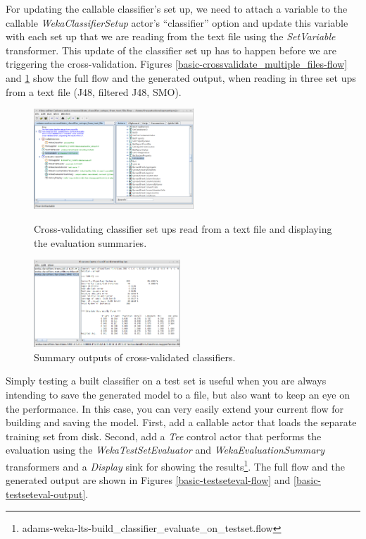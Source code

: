 For updating the callable classifier's set up, we need to attach a variable to the
callable \textit{WekaClassifierSetup} actor's ``classifier'' option and update this
variable with each set up that we are reading from the text file using the
\textit{SetVariable} transformer. This update of the classifier set up has to
happen before we are triggering the cross-validation. Figures
\ref{basic-crossvalidate_multiple_files-flow} and
\ref{basic-crossvalidate_multiple_files-output} show the full flow and the
generated output, when reading in three set ups from a text file (J48,
filtered J48, SMO).

\begin{figure}[ht]
  \begin{minipage}[t]{0.5\linewidth}
    \centering
    \includegraphics[width=6.0cm]{images/basic-crossvalidate_multiple_files-flow.png}
    \caption{Cross-validating classifier set ups read from a text file and
    displaying the evaluation summaries.}
    \label{basic-crossvalidate_multiple_files-flow}
  \end{minipage}
  \hspace{0.5cm}
  \begin{minipage}[t]{0.5\linewidth}
    \centering
    \includegraphics[width=5.5cm]{images/basic-crossvalidate_multiple_files-output.png}
    \caption{Summary outputs of cross-validated classifiers.}
    \label{basic-crossvalidate_multiple_files-output}
  \end{minipage}
\end{figure}

Simply testing a built classifier on a test set is useful when you are always
intending to save the generated model to a file, but also want to keep an eye on
the performance. In this case, you can very easily extend your current flow for
building and saving the model. First, add a callable actor that loads the separate
training set from disk. Second, add a \textit{Tee} control actor that performs
the evaluation using the \textit{WekaTestSetEvaluator} and
\textit{WekaEvaluationSummary} transformers and a \textit{Display} sink for
showing the
results\footnote{adams-weka-lts-build\_classifier\_evaluate\_on\_testset.flow}. The
full flow and the generated output are shown in Figures
\ref{basic-testseteval-flow} and \ref{basic-testseteval-output}.


